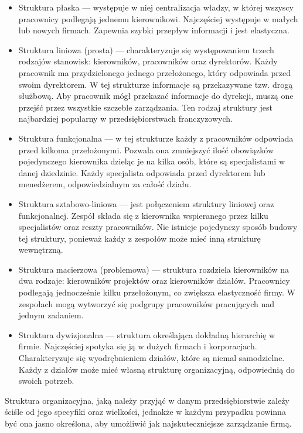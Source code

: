 \begin{itemize}
    \item Struktura płaska --- występuje w niej centralizacja władzy, w której wszyscy pracownicy podlegają jednemu kierownikowi. Najczęściej występuje w małych lub nowych firmach. Zapewnia szybki przepływ informacji i jest elastyczna.

    \item Struktura liniowa (prosta) --- charakteryzuje się występowaniem trzech rodzajów stanowisk: kierowników, pracowników oraz dyrektorów. Każdy pracownik ma przydzielonego jednego przełożonego, który odpowiada przed swoim dyrektorem. W tej strukturze informacje są przekazywane tzw. drogą służbową. Aby pracownik mógł przekazać informacje do dyrekcji, muszą one przejść przez wszystkie szczeble zarządzania. Ten rodzaj struktury jest najbardziej popularny w przedsiębiorstwach franczyzowych.

    \item Struktura funkcjonalna --- w tej strukturze każdy z pracowników odpowiada przed kilkoma przełożonymi. Pozwala ona zmniejszyć ilość obowiązków pojedynczego kierownika dzieląc je na kilka osób, które są specjalistami w danej dziedzinie. Każdy specjalista odpowiada przed dyrektorem lub menedżerem, odpowiedzialnym za całość działu.

    \item Struktura sztabowo-liniowa --- jest połączeniem struktury liniowej oraz funkcjonalnej. Zespół składa się z kierownika wspieranego przez kilku specjalistów oraz reszty pracowników. Nie istnieje pojedynczy sposób budowy tej struktury, ponieważ każdy z zespołów może mieć inną strukturę wewnętrzną.

    \item Struktura macierzowa (problemowa) --- struktura rozdziela kierowników na dwa rodzaje: kierowników projektów oraz kierowników działów. Pracownicy podlegają jednocześnie kilku przełożonym, co zwiększa elastyczność firmy. W zespołach mogą wytworzyć się podgrupy pracowników pracujących nad jednym zadaniem.

    \item Struktura dywizjonalna --- struktura określająca dokładną hierarchię w firmie. Najczęściej spotyka się ją w dużych firmach i korporacjach. Charakteryzuje się wyodrębnieniem działów, które są niemal samodzielne. Każdy z działów może mieć własną strukturę organizacyjną, odpowiednią do swoich potrzeb.
\end{itemize}

Struktura organizacyjna, jaką należy przyjąć w danym przedsiębiorstwie zależy ściśle od jego specyfiki oraz wielkości, jednakże w każdym przypadku powinna być ona jasno określona, aby umożliwić jak najskuteczniejsze zarządzanie firmą.


